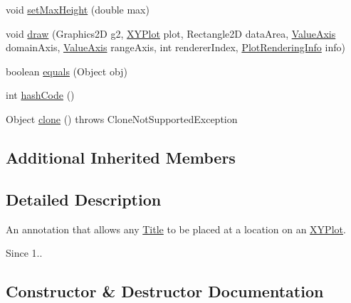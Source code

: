 \begin{DoxyCompactItemize}
void \mbox{\hyperlink{classorg_1_1jfree_1_1chart_1_1annotations_1_1_x_y_title_annotation_ac6612f63eacdc1754481d37db0d4e33e}{set\+Max\+Height}} (double max)
\item 
void \mbox{\hyperlink{classorg_1_1jfree_1_1chart_1_1annotations_1_1_x_y_title_annotation_a368201fcdb97475b258896f458c03451}{draw}} (Graphics2D g2, \mbox{\hyperlink{classorg_1_1jfree_1_1chart_1_1plot_1_1_x_y_plot}{X\+Y\+Plot}} plot, Rectangle2D data\+Area, \mbox{\hyperlink{classorg_1_1jfree_1_1chart_1_1axis_1_1_value_axis}{Value\+Axis}} domain\+Axis, \mbox{\hyperlink{classorg_1_1jfree_1_1chart_1_1axis_1_1_value_axis}{Value\+Axis}} range\+Axis, int renderer\+Index, \mbox{\hyperlink{classorg_1_1jfree_1_1chart_1_1plot_1_1_plot_rendering_info}{Plot\+Rendering\+Info}} info)
\item 
boolean \mbox{\hyperlink{classorg_1_1jfree_1_1chart_1_1annotations_1_1_x_y_title_annotation_ab2b45f6690df197fdccd74000ae54d35}{equals}} (Object obj)
\item 
int \mbox{\hyperlink{classorg_1_1jfree_1_1chart_1_1annotations_1_1_x_y_title_annotation_aefaa027c03b0f04689ab8a88a15ef459}{hash\+Code}} ()
\item 
Object \mbox{\hyperlink{classorg_1_1jfree_1_1chart_1_1annotations_1_1_x_y_title_annotation_aa75ea9537272ebaa5df67ee80b6509fa}{clone}} ()  throws Clone\+Not\+Supported\+Exception 
\end{DoxyCompactItemize}
\subsection*{Additional Inherited Members}


\subsection{Detailed Description}
An annotation that allows any \mbox{\hyperlink{}{Title}} to be placed at a location on an \mbox{\hyperlink{}{X\+Y\+Plot}}.

\begin{DoxySince}{Since}
1.. 
\end{DoxySince}


\subsection{Constructor \& Destructor Documentation}
\mbox{\label{classorg_1_1jfree_1_1chart_1_1annotations_1_1_x_y_title_annotation_acc62d8c5dce0c03865845f8c751b15e2}} 
